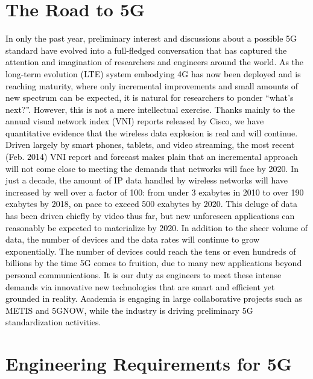 
\section{The Road to 5G}

\textcolor{black}{In only the past year, preliminary interest and discussions about a possible 5G standard have evolved into a full-fledged conversation that has captured the attention and imagination of researchers and engineers around the world. As the long-term evolution (LTE) system embodying 4G has now been deployed and is reaching maturity, where only incremental improvements and small amounts of new spectrum can be expected, it is natural for researchers to ponder “what’s next?”. However, this is not a mere intellectual exercise. Thanks mainly to the annual visual network index (VNI) reports released by Cisco, we have quantitative evidence that the wireless data explosion is real and will continue. Driven largely by smart phones, tablets, and video streaming, the most recent (Feb. 2014) VNI report and forecast makes plain that an incremental approach will not come close to meeting the demands that networks will face by 2020. In just a decade, the amount of IP data handled by wireless networks will have increased by well over a factor of 100: from under 3 exabytes in 2010 to over 190 exabytes by 2018, on pace to exceed 500 exabytes by 2020. This deluge of data has been driven chiefly by video thus far, but new unforeseen applications can reasonably be expected to materialize by 2020. In addition to the sheer volume of data, the number of devices and the data rates will continue to grow exponentially. The number of devices could reach the tens or even hundreds of billions by the time 5G comes to fruition, due to many new applications beyond personal communications. It is our duty as engineers to meet these intense demands via innovative new technologies that are smart and efficient yet grounded in reality. Academia is engaging in large collaborative projects such as METIS and 5GNOW, while the industry is driving preliminary 5G standardization activities.}

\section{Engineering Requirements for 5G}

